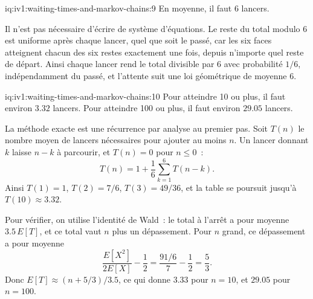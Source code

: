 \begin{solution}{iq:iv1:waiting-times-and-markov-chains:9}
En moyenne, il faut 6 lancers.

Il n'est pas nécessaire d'écrire de système d'équations. Le reste du total modulo 6 est uniforme après chaque lancer, quel que soit le passé, car les six faces atteignent chacun des six restes exactement une fois, depuis n'importe quel reste de départ. Ainsi chaque lancer rend le total divisible par 6 avec probabilité $1/6$, indépendamment du passé, et l'attente suit une loi géométrique de moyenne 6.

\end{solution}

\enlargethispage{-3\baselineskip}%
\begin{solution}{iq:iv1:waiting-times-and-markov-chains:10}
Pour atteindre 10 ou plus, il faut environ $3.32$ lancers. Pour atteindre 100 ou plus, il faut environ $29.05$ lancers.

La méthode exacte est une récurrence par analyse au premier pas. Soit $T(n)$ le nombre moyen de lancers nécessaires pour ajouter au moins $n$. Un lancer donnant $k$ laisse $n - k$ à parcourir, et $T(n) = 0$ pour $n \le 0$~:
\[
T(n) = 1 + \frac16 \sum_{k=1}^{6} T(n - k).
\]
Ainsi $T(1) = 1$, $T(2) = 7/6$, $T(3) = 49/36$, et la table se poursuit jusqu'à $T(10) \approx 3.32$.

Pour vérifier, on utilise l'identité de Wald~: le total à l'arrêt a pour moyenne $3.5\,E[T]$, et ce total vaut $n$ plus un dépassement. Pour $n$ grand, ce dépassement a pour moyenne
\[
\frac{E[X^2]}{2E[X]} - \frac12 = \frac{91/6}{7} - \frac12 = \frac53.
\]
Donc $E[T] \approx (n + 5/3)/3.5$, ce qui donne $3.33$ pour $n = 10$, et $29.05$ pour $n = 100$.

\end{solution}


